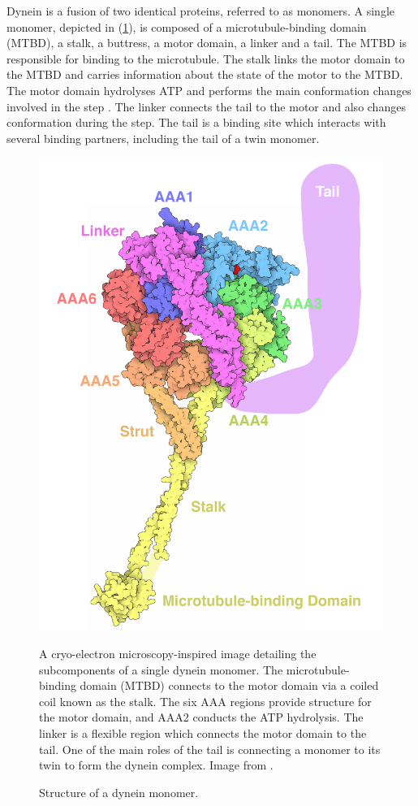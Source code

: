 \documentclass[
11pt, %
english, %
singlespacing, %
headsepline, %
chapterinoneline, %
]{MastersDoctoralThesis} %
\begin{document}
Dynein is a fusion of two identical proteins, referred to as monomers. A single monomer, depicted in (\ref{fig:pdb-motm-dynein}), is composed of a microtubule-binding domain (MTBD), a stalk, a buttress, a motor domain, a linker and a tail. The MTBD is responsible for binding to the microtubule. The stalk links the motor domain to the MTBD and carries information about the state of the motor to the MTBD. The motor domain hydrolyses ATP and performs the main conformation changes involved in the step \cite{FRETstatepaper}. The linker connects the tail to the motor and also changes conformation during the step. The tail is a binding site which interacts with several binding partners, including the tail of a twin monomer.\\

\begin{figure}[h]
  \centering
  \includegraphics[width=.5\textwidth,keepaspectratio]{../../figures/pdb-motm-dynein}
  \caption{Structure of a dynein monomer.}{A cryo-electron microscopy-inspired image detailing the subcomponents of a single dynein monomer. The microtubule-binding domain (MTBD) connects to the motor domain via a coiled coil known as the stalk. The six AAA regions provide structure for the motor domain, and AAA2 conducts the ATP hydrolysis. The linker is a flexible region which connects the motor domain to the tail. One of the main roles of the tail is connecting a monomer to its twin to form the dynein complex. Image from \cite{pdb-motm-dynein}.}
  \label{fig:pdb-motm-dynein}
\end{figure}
\end{document}

